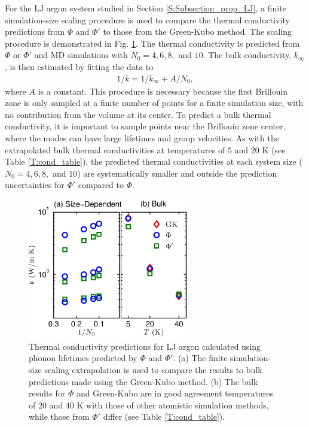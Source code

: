 \documentclass[12pt,twocolumn,iop]{/usr/share/texmf-texlive/tex/latex/iop/iopart}[/usr/share/texmf-texlive/tex/latex/iop/]
\begin{document}
For the LJ argon system studied in Section \ref{S:Subsection_prop_LJ}, a finite simulation-size scaling procedure\cite{turney2009a,He2011} is used to compare the thermal conductivity predictions from $\Phi$ and $\Phi'$ to those from the Green-Kubo method. The scaling procedure is demonstrated in Fig$.$ \ref{F:LJ_COND}.  The thermal conductivity is predicted from $\Phi$ or $\Phi'$ and MD simulations with $N_0 = 4,6,8,$ and $10$. The bulk conductivity, $k_{\infty}$, is then estimated by fitting the data to
\begin{equation}\label{k_size}
\begin{split}
1/k = 1/k_{\infty} + A/N_0,
 \end{split}
\end{equation}
where $A$ is a constant. This procedure is necessary because the first Brillouin zone is only sampled at a finite number of points for a finite simulation size, with no contribution from the volume at its center. To predict a bulk thermal conductivity, it is important to sample points near the Brillouin zone center, where the modes can have large lifetimes and group velocities.\cite{turney2009a,sellan2010b} As with the extrapolated bulk thermal conductivities at temperatures of $5$ and $20$ K (see Table \ref{T:cond_table}), the predicted thermal conductivities at each system size ($N_0=4,6,8,$ and $10$) are systematically smaller and outside the prediction uncertainties for $\Phi'$ compared to $\Phi$.

\begin{figure}
\begin{center}
\includegraphics[angle=0,width=70.0mm]{figure6.eps}
\caption{\label{F:LJ_COND} Thermal conductivity predictions for LJ argon calculated using phonon lifetimes predicted by $\Phi$ and $\Phi'$. (a) The finite simulation-size scaling extrapolation \cite{turney2009a,He2011} is used to compare the results to bulk predictions made using the Green-Kubo method. (b) The bulk results for $\Phi$ and Green-Kubo are in good agreement temperatures of $20$ and $40$ K with those of other atomistic simulation methods,\cite{turney2009a} while those from $\Phi'$ differ (see Table \ref{T:cond_table}).}
\end{center}
\end{figure}

\setcounter{section}{1}

\vspace*{100mm}






\end{document}
